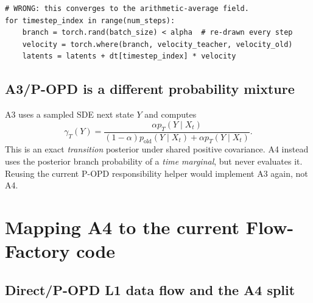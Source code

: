 \documentclass[11pt,a4paper]{article}
\theoremstyle{plain}
\theoremstyle{definition}
\begin{document}
\begin{lstlisting}[style=badpython,caption={Per-step branch sampling changes the target method.}]
# WRONG: this converges to the arithmetic-average field.
for timestep_index in range(num_steps):
    branch = torch.rand(batch_size) < alpha  # re-drawn every step
    velocity = torch.where(branch, velocity_teacher, velocity_old)
    latents = latents + dt[timestep_index] * velocity
\end{lstlisting}

\subsection{A3/P-OPD is a different probability mixture}

A3 uses a sampled SDE next state $Y$ and computes
\begin{equation}
\gamma_T(Y)
=
\frac{\alpha p_T(Y\mid X_t)}
{(1-\alpha)p_{\mathrm{old}}(Y\mid X_t)+\alpha p_T(Y\mid X_t)}.
\label{eq:a3-gate}
\end{equation}
This is an exact \emph{transition} posterior under shared positive covariance.  A4 instead uses
the posterior branch probability of a \emph{time marginal}, but never evaluates it.  Reusing the
current P-OPD responsibility helper would implement A3 again, not A4.

\section{Mapping A4 to the current Flow-Factory code}
\label{sec:code-map}

\subsection{Direct/P-OPD L1 data flow and the A4 split}
\end{document}
